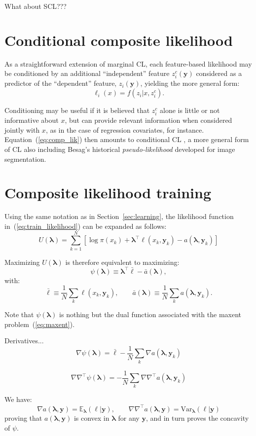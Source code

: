 \documentclass[english]{scrartcl}
\def\y{{\mathbf{y}}}
\newcommand{\blambda}{{\boldsymbol{\lambda}}}
\newcommand{\bell}{{\boldsymbol{\ell}}}
\newcommand{\E}{\mathbb{E}}
\begin{document}
What about SCL???

\section{Conditional composite likelihood}
\label{app:conditional}

As a straightforward  extension of marginal CL, each feature-based likelihood may be conditioned by an additional ``independent'' feature $z^c_i(\y)$ considered as a predictor of the ``dependent'' feature, $z_i(\y)$, yielding the more general form:
\begin{equation}
\label{eq:cond_feat_lik}
\ell_i(x) = f(z_i|x,z^c_i).
\end{equation}

Conditioning may be useful if it is believed that $z^c_i$ alone is little or not informative about $x$, but can provide relevant information when considered jointly with $x$, as in the case of regression covariates, for instance. Equation~(\ref{eq:comp_lik}) then amounts to conditional CL \cite{Varin-11}, a more general form of CL also including Besag's historical {\em pseudo-likelihood} \cite{Besag-74} developed for image segmentation.


\section{Composite likelihood training}
\label{app:training}

Using the same notation as in Section~\ref{sec:learning}, the likelihood function in~(\ref{eq:train_likelihood}) can be expanded as follows:
$$
U(\blambda) 
= \sum_{k=1}^N \left[
\log \pi(x_k) + \blambda^\top \bell(x_k, \y_k) - a(\blambda,\y_k)
\right]
$$

Maximizing $U(\blambda)$ is therefore equivalent to maximizing: 
$$
\psi(\blambda) \equiv \blambda^\top \bar{\bell} - \bar{a}(\blambda), 
$$
with:
$$
\bar{\bell} \equiv \frac{1}{N} \sum_k \bell(x_k,\y_k),
\qquad
\bar{a}(\blambda) \equiv \frac{1}{N} \sum_k a(\blambda,\y_k).
$$

Note that $\psi(\blambda)$ is nothing but the dual function associated with the maxent problem~(\ref{eq:maxent}). 

Derivatives...
$$
\nabla\psi(\blambda)
= \bar{\bell} - \frac{1}{N} \sum_k \nabla a(\blambda,\y_k) 
$$

$$
\nabla\nabla^\top\psi(\blambda)
= - \frac{1}{N} \sum_k \nabla \nabla^\top a(\blambda,\y_k)  
$$

We have:
$$
\nabla a(\blambda,\y) = \E_{\blambda}(\bell|\y),
\qquad
\nabla \nabla^\top a(\blambda,\y) = \text{Var}_{\blambda}(\bell|\y)
$$
proving that $a(\blambda,\y)$ is convex in $\blambda$ for any $\y$, and in turn proves the concavity of $\psi$.
\end{document}
